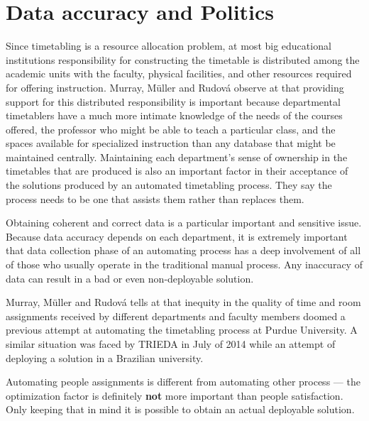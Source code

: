 \section{Data accuracy and Politics}

Since timetabling is a resource allocation problem, at most big educational institutions responsibility for constructing the timetable is distributed among the academic units with the faculty, physical facilities, and other resources required for offering instruction. Murray, M\"{u}ller and Rudov\'{a} observe at \cite{Murray2007} that providing support for this distributed responsibility is important because departmental timetablers have a much more intimate knowledge of the needs of the courses offered, the professor who might be able to teach a particular class, and the spaces available for specialized instruction than any database that might be maintained centrally. Maintaining each department's sense of ownership in the timetables that are produced is also an important factor in their acceptance of the solutions produced by an automated timetabling process. They say the process needs to be one that assists them rather than replaces them.

Obtaining coherent and correct data is a particular important and sensitive issue. Because data accuracy depends on each department, it is extremely important that data collection phase of an automating process has a deep involvement of all of those who usually operate in the traditional manual process. Any inaccuracy of data can result in a bad or even non-deployable solution.


Murray, M\"{u}ller and Rudov\'{a} tells at \cite{Murray2007} that inequity in the quality of time and room assignments received by different departments and faculty members doomed a previous attempt at automating the timetabling process at Purdue University. A similar situation was faced by TRIEDA in July of 2014 while an attempt of deploying a solution in a Brazilian university.

Automating people assignments is different from automating other process --- the optimization factor is definitely \textbf{not} more important than people satisfaction. Only keeping that in mind it is possible to obtain an actual deployable solution.

